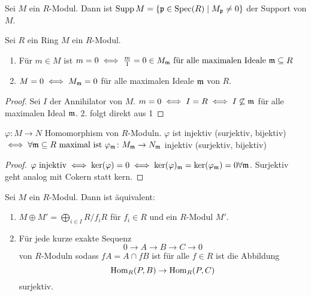 \begin{Def}
    Sei \(M\) ein \(R\)-Modul. Dann ist \(\operatorname{Supp} M=\{\mathfrak{p}\in\operatorname{Spec}(R)\mid M_{\mathfrak{p}}\neq 0\}\) der Support von \(M\).
\end{Def}
\begin{Lemma}
    Sei \(R\) ein Ring \(M\) ein \(R\)-Modul.
    \begin{enumerate}
        \item Für \(m\in M\) ist \(m=0\iff \frac m 1=0\in M_{\mathfrak{m}} \text{ für alle maximalen Ideale }\mathfrak{m}\subseteq R\)
        \item \(M=0\iff M_{\mathfrak{m}}=0\) für alle maximalen Ideale \(\mathfrak{m}\) von \(R\).
    \end{enumerate}
\end{Lemma}
\begin{proof}
    Sei \(I\) der Annihilator von \(M\).
    \(m=0\iff I=R\iff I\not\subseteq \mathfrak{m}\) für alle maximalen Ideal \(\mathfrak{m}\).
    2. folgt direkt aus 1
\end{proof}
\begin{Kor}\label{Kor:LokSurjInjBij}
    \(\varphi\colon M\to N\) Homomorphism von \(R\)-Moduln.
    \(\varphi\) ist injektiv (surjektiv, bijektiv) \(\iff \forall \mathfrak{m}\subseteq R \text{ maximal ist } \varphi_{\mathfrak{m}}\colon M_{\mathfrak{m}}\to N_{\mathfrak{m}}\) injektiv (surjektiv, bijektiv) 
\end{Kor}
\begin{proof}
    \(\varphi \text{ injektiv} \iff \ker(\varphi)=0\iff \ker(\varphi)_{\mathfrak{m}}=\ker(\varphi_{\mathfrak{m}})=0 \forall \mathfrak{m}\). Surjektiv geht analog mit Cokern statt kern.
\end{proof}
\begin{Lemma}\label{Lem:SpaltenModDirSum}
    Sei \(M\) ein \(R\)-Modul. Dann ist äquivalent:
    \begin{enumerate}
        \item \(M\oplus M'=\bigoplus_{i\in I}R/f_iR\) für \(f_i\in R\) und ein \(R\)-Modul \(M'\).
        \item Für jede kurze exakte Sequenz \[0\to A\to B\to C\to 0\] von \(R\)-Moduln sodass \(fA=A\cap fB\) ist für alle \(f\in R\) ist die Abbildung \[\operatorname{Hom}_R(P,B)\to\operatorname{Hom}_R(P,C)\] surjektiv.
    \end{enumerate}
\end{Lemma}
